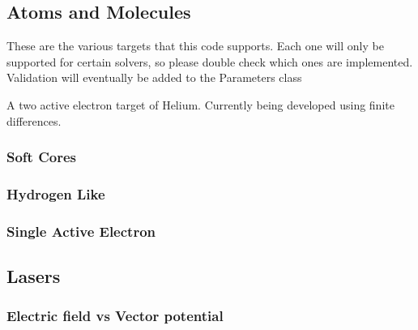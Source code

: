 \documentclass{article}
\begin{document}

\subsection{Atoms and Molecules} %
\label{sub:atoms_and_molecules}
These are the various targets that this code supports. Each one will only be supported for certain solvers, so please double check which ones are implemented. Validation will eventually be added to the Parameters class

A two active electron target of Helium. Currently being developed using finite differences.

\subsubsection{Soft Cores} %
\label{ssub:soft_cores}


\subsubsection{Hydrogen Like} %
\label{ssub:hydrogen_like}


\subsubsection{Single Active Electron} %
\label{ssub:single_active_electron}


\subsection{Lasers} %
\label{sub:lasers}

\subsubsection{Electric field vs Vector potential} %
\label{ssub:electric_field_vs_vector_potential}



\end{document}
